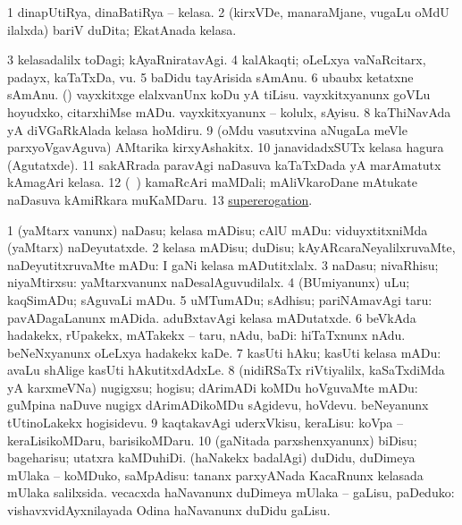 \begin{center}
\noindent
\gl{\pagu}
\expl{}
\bmng
\bnum
\num{1}  dinapUtiRya, dinaBatiRya -- kelasa. 
\num{2}  (kirxVDe, manaraMjane, \mo vugaLu oMdU ilalxda) bariV duDita; EkatAnada kelasa. 
\num{3}  kelasadalilx toDagi; kAyaRniratavAgi. 
\num{4}  kalAkaqti; oLeLxya vaNaRcitarx, padayx, kaTaTxDa, \mo vu. 
\num{5}  baDidu tayArisida sAmAnu. 
\num{6}  ubaubx ketatxne sAmAnu. 
  (\AmA) 
\banum
{} vayxkitxge elalxvanUnx koDu yA tiLisu. 
 vayxkitxyanunx goVLu hoyudxko, citarxhiMse mADu. 
 vayxkitxyanunx -- kolulx, sAyisu. 
\eanum
\numie
\num{8}  kaThiNavAda yA diVGaRkAlada kelasa hoMdiru. 
\num{9}  (oMdu vasutxvina aNugaLa meVle parxyoVgavAguva) AMtarika kirxyAshakitx. 
\num{10}  janavidadxSUTx kelasa hagura (Agutatxde). 
\num{11}  sakARrada paravAgi naDasuva kaTaTxDada yA marAmatutx kAmagAri kelasa. 
\num{12}  (\kanmu\ \birx) kamaRcAri maMDali; mAliVkaroDane mAtukate naDasuva kAmiRkara muKaMDaru. 
\num{13}  \hyperref{kandict_s.pdf}{S}{supererogation pagu}{supererogation}. 
\enum
\emng
\eentry

\bentry
{} 
\gl{\kirx}


\noindent
\gl{\sakirx}
\bmng
\bnum
\num{1} (yaMtarx \mo vanunx) naDasu; kelasa mADisu; cAlU mADu:  viduyxtitxniMda (yaMtarx) naDeyutatxde. 
\num{2} kelasa mADisu; duDisu; kAyARcaraNeyalilxruvaMte, naDeyutitxruvaMte mADu:  I gaNi kelasa mADutitxlalx. 
\num{3} naDasu; nivaRhisu; niyaMtirxsu:  yaMtarxvanunx naDesalAguvudilalx. 
\num{4} (BUmiyanunx) uLu; kaqSimADu; sAguvaLi mADu. 
\num{5} uMTumADu; sAdhisu; pariNAmavAgi taru:  pavADagaLanunx mADida.  aduBxtavAgi kelasa mADutatxde. 
\num{6} beVkAda hadakekx, rUpakekx, mATakekx -- taru, nAdu, baDi:  hiTaTxnunx nAdu.  beNeNxyanunx oLeLxya hadakekx kaDe. 
\num{7} kasUti hAku; kasUti kelasa mADu:  avaLu shAlige kasUti hAkutitxdAdxLe. 
\num{8} (nidiRSaTx riVtiyalilx, kaSaTxdiMda yA karxmeVNa) nugigxsu; hogisu; dArimADi koMDu hoVguvaMte mADu:  guMpina naDuve nugigx dArimADikoMDu sAgidevu, hoVdevu.  beNeyanunx tUtinoLakekx hogisidevu. 
\num{9} kaqtakavAgi uderxVkisu, keraLisu:  koVpa -- keraLisikoMDaru, barisikoMDaru. 
\num{10} (gaNitada parxshenxyanunx) biDisu; bageharisu; utatxra kaMDuhiDi. 
\banum
{} (haNakekx badalAgi) duDidu, duDimeya mUlaka -- koMDuko, saMpAdisu:   tananx parxyANada KacaRnunx kelasada mUlaka salilxsida. 
 vecacxda haNavanunx duDimeya mUlaka -- gaLisu, paDeduko:  vishavxvidAyxnilayada Odina haNavanunx duDidu gaLisu. 
\eanum
\numie
\enum
\emng


\end{center}
